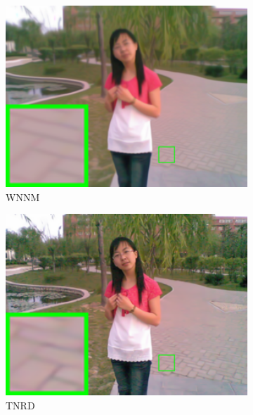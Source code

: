 \begin{figure}
\begin{subfigure}[t]{0.24\textwidth}
        \includegraphics[width=1\textwidth]{images/twsc/nc/resize_br_WNNM_chinesegirl.png}
\caption{WNNM}
    \end{subfigure}
    \hfill
    \begin{subfigure}[t]{0.24\textwidth}
        \centering
        \includegraphics[width=1\textwidth]{images/twsc/nc/resize_br_TRD_chinesegirl.png}
\caption{TNRD}
    \end{subfigure}
    \hfill
    \begin{subfigure}[t]{0.24\textwidth}
        \centering

\end{subfigure}
\end{figure}
